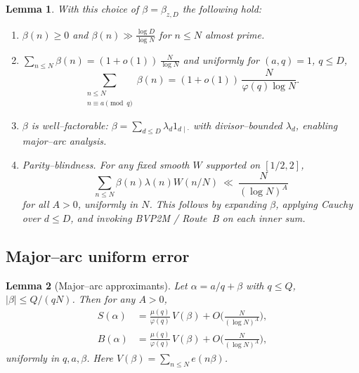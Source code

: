 \documentclass[11pt]{article}
\newtheorem{lemma}{Lemma}[part]
\theoremstyle{definition}
\theoremstyle{remark}
\numberwithin{equation}{part}
\begin{document}
\begin{lemma}\label{lem:beta-properties}
	With this choice of $\beta=\beta_{z,D}$ the following hold:
	\begin{enumerate}[label=(B\arabic*)]
		\item $\beta(n)\ge 0$ and $\beta(n)\gg \frac{\log D}{\log N}$ for $n\le N$ almost prime.
		\item $\sum_{n\le N}\beta(n)=(1+o(1))\,\tfrac{N}{\log N}$ and uniformly for $(a,q)=1$, $q\le D$,
		      \[
			      \sum_{\substack{n\le N\\ n\equiv a\pmod q}}\beta(n)
			      =(1+o(1))\,\frac{N}{\varphi(q)\log N}.
		      \]
		\item $\beta$ is well--factorable: $\beta=\sum_{d\le D}\lambda_d 1_{d\mid\cdot}$ with divisor--bounded $\lambda_d$, enabling major--arc analysis.
		\item \emph{Parity--blindness.} For any fixed smooth $W$ supported on $[1/2,2]$,
		      \[
			      \sum_{n\le N}\beta(n)\lambda(n)W(n/N)
			      \ \ll\ \frac{N}{(\log N)^A}
		      \]
		      for all $A>0$, uniformly in $N$. This follows by expanding $\beta$, applying Cauchy over $d\le D$, and invoking BVP2M / Route~B on each inner sum.
	\end{enumerate}
\end{lemma}

\subsection{Major--arc uniform error}

\begin{lemma}[Major--arc approximants]\label{lem:major-errors}
	Let $\alpha=a/q+\beta$ with $q\le Q$, $|\beta|\le Q/(qN)$. Then for any $A>0$,
	\begin{align*}
		S(\alpha) & =\frac{\mu(q)}{\varphi(q)}\,V(\beta)+O\!\Big(\frac{N}{(\log N)^A}\Big), \\
		B(\alpha) & =\frac{\mu(q)}{\varphi(q)}\,V(\beta)+O\!\Big(\frac{N}{(\log N)^A}\Big),
	\end{align*}
	uniformly in $q,a,\beta$. Here $V(\beta)=\sum_{n\le N}e(n\beta)$.
\end{lemma}
\end{document}
